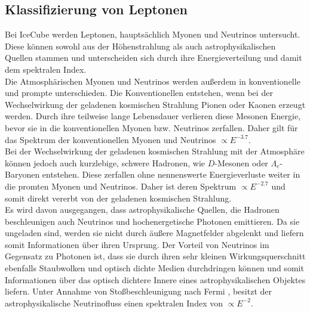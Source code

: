 \subsection{Klassifizierung von Leptonen}
Bei IceCube werden Leptonen, hauptsächlich Myonen und Neutrinos untersucht. Diese können sowohl aus der Höhenstrahlung als auch astrophysikalischen Quellen stammen und unterscheiden sich durch ihre Energieverteilung und damit dem spektralen Index. \\
Die Atmosphärischen Myonen und Neutrinos werden außerdem in konventionelle und prompte unterschieden. Die Konventionellen entstehen, wenn bei der Wechselwirkung der geladenen kosmischen Strahlung Pionen oder Kaonen erzeugt werden. Durch ihre teilweise lange Lebensdauer verlieren diese Mesonen Energie, bevor sie in die konventionellen Myonen bzw. Neutrinos zerfallen. Daher gilt für das Spektrum der konventionellen Myonen und Neutrinos $\propto E^{-3.7}$.\\
Bei der Wechselwirkung der geladenen kosmischen Strahlung mit der Atmosphäre können jedoch auch kurzlebige, schwere Hadronen, wie $D$-Mesonen oder $\Lambda_{c}$-Baryonen entstehen. Diese zerfallen ohne nennenswerte Energieverluste weiter in die promten Myonen und Neutrinos. Daher ist deren Spektrum  $\propto E^{-2.7}$ und somit direkt vererbt von der geladenen kosmischen Strahlung.\\
Es wird davon ausgegangen, dass astrophysikalische Quellen, die Hadronen beschleunigen auch Neutrinos und hochenergetische Photonen emittieren. Da sie ungeladen sind, werden sie nicht durch äußere Magnetfelder abgelenkt und liefern somit Informationen über ihren Ursprung. Der Vorteil von Neutrinos im Gegensatz zu Photonen ist, dass sie durch ihren sehr kleinen Wirkungsquerschnitt ebenfalls Staubwolken und optisch dichte Medien durchdringen können und somit Informationen über das optisch dichtere Innere eines astrophysikalischen Objektes liefern. Unter Annahme von Stoßbeschleunigung nach Fermi \cite{PhysRev.75.1169}, besitzt der astrophysikalische Neutrinofluss einen spektralen Index von  $\propto E^{-2}$.\\
